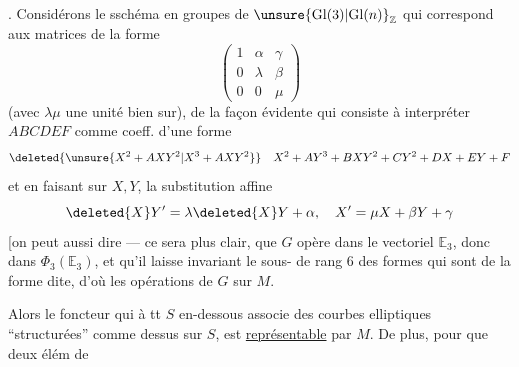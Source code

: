  . Considérons le sschéma en groupes de $\unsure{\mathrm{Gl}(3)|\mathrm{Gl}(n)}_{\mathbb Z}$ qui correspond aux matrices de la forme
\[
\begin{pmatrix}1&\alpha&\gamma\\0&\lambda&\beta\\0&0&\mu\end{pmatrix}
\]
(avec $\lambda\mu$ une unité bien sur),  de la façon évidente qui consiste à interpréter $ABCDEF$ comme coeff. d'une forme
\[
\deleted{\unsure{X^2+AXY^2|X^3+AXY^2}} \quad X^2+AY^3+BXY^2+CY^2+DX+EY+F
\]
et en faisant sur $X,Y$, la substitution affine
\[
\deleted{X}Y'=\lambda\deleted{X}Y+\alpha,\quad X'=\mu X+\beta Y+\gamma
\]
[on peut aussi dire --- ce sera plus clair, que $G$ opère dans le vectoriel $\mathbb E_3$, donc dans $\Phi_3(\mathbb E_3)$, et qu'il laisse invariant le sous- de  rang 6 des formes qui sont de la forme dite, d'où les opérations de $G$ sur $M$.


Alors le foncteur qui à tt $S$ en-dessous associe  des courbes elliptiques ``structurées'' comme dessus sur $S$, est \uline{représentable} par $M$. De plus, pour que deux élém de
